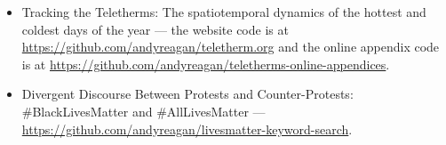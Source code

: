 \begin{itemize}
\item Tracking the Teletherms: The spatiotemporal dynamics of the hottest and coldest days of the year --- the website code is at \href{https://github.com/andyreagan/teletherm.org}{https://github.com/andyreagan/teletherm.org} and the online appendix code is at \href{https://github.com/andyreagan/teletherms-online-appendices}{https://github.com/andyreagan/teletherms-online-appendices}.
\item Divergent Discourse Between Protests and Counter-Protests: \#BlackLivesMatter and \#AllLivesMatter --- \href{https://github.com/andyreagan/livesmatter-keyword-search}{https://github.com/andyreagan/livesmatter-keyword-search}.
\end{itemize}

